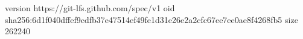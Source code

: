 version https://git-lfs.github.com/spec/v1
oid sha256:6d1f040dffef9cdfb37e47514ef49fe1d31e26e2a2cfc67ee7ee0ae8f4268fb5
size 262240
